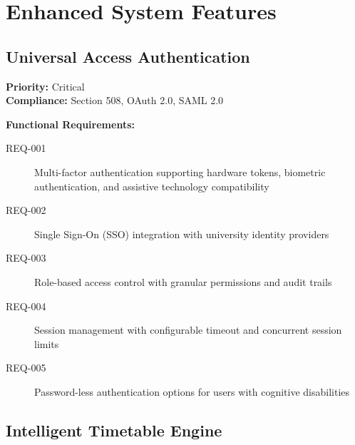 \documentclass[11pt, a4paper]{article}
\begin{document}
\section{Enhanced System Features}
\label{sec:enhanced_features}

\subsection{Universal Access Authentication}
\label{sec:universal_auth}

\begin{requirementbox}[title=Authentication \& Authorization]
\textbf{Priority:} Critical \\
\textbf{Compliance:} Section 508, OAuth 2.0, SAML 2.0

\textbf{Functional Requirements:}
\begin{description}
    \item[REQ-001] Multi-factor authentication supporting hardware tokens, biometric authentication, and assistive technology compatibility
    \item[REQ-002] Single Sign-On (SSO) integration with university identity providers
    \item[REQ-003] Role-based access control with granular permissions and audit trails
    \item[REQ-004] Session management with configurable timeout and concurrent session limits
    \item[REQ-005] Password-less authentication options for users with cognitive disabilities
\end{description}
\end{requirementbox}

\subsection{Intelligent Timetable Engine}
\label{sec:intelligent_timetable}
\end{document}
